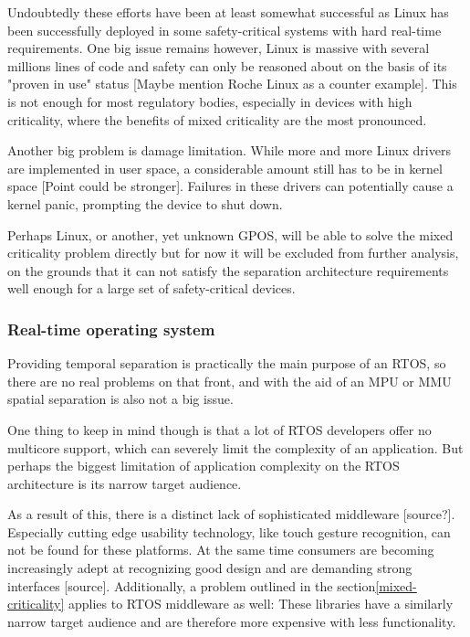 Undoubtedly these efforts have been at least somewhat successful as Linux has been successfully deployed in some safety-critical systems with hard real-time requirements. One big issue remains however, Linux is massive with several millions lines of code and safety can only be reasoned about on the basis of its "proven in use" status [Maybe mention Roche Linux as a counter example]. This is not enough for most regulatory bodies, especially in devices with high criticality, where the benefits of mixed criticality are the most pronounced.

Another big problem is damage limitation. While more and more Linux drivers are implemented in user space, a considerable amount still has to be in kernel space [Point could be stronger]. Failures in these drivers can potentially cause a kernel panic, prompting the device to shut down. 

Perhaps Linux, or another, yet unknown GPOS, will be able to solve the mixed criticality problem directly but for now it will be excluded from further analysis, on the grounds that it can not satisfy the separation architecture requirements well enough for a large set of safety-critical devices.
\subsubsection{Real-time operating system}
Providing temporal separation is practically the main purpose of an RTOS, so there are no real problems on that front, and with the aid of an \gls{MPU} or \gls{MMU} spatial separation is also not a big issue.

One thing to keep in mind though is that a lot of RTOS developers offer no multicore support, which can severely limit the complexity of an application. But perhaps the biggest limitation of application complexity on the RTOS architecture is its narrow target audience.

As a result of this, there is a distinct lack of sophisticated middleware [source?]. Especially cutting edge usability technology, like touch gesture recognition, can not be found for these platforms. At the same time consumers are becoming increasingly adept at recognizing good design and are demanding strong interfaces [source].
Additionally, a problem outlined in the section\ref{mixed-criticality} applies to RTOS middleware as well: These libraries have a similarly narrow target audience and are therefore more expensive with less functionality.

